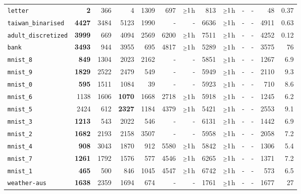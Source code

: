 \begin{tabular}{lrrrrrrrrrrrr}
\texttt{letter} & \textbf{2} & 366 & 4 & 1309 & 697 & $\mathsmaller{\geq}1$h & 813 & $\mathsmaller{\geq}1$h & - & - & 48 & 0.37\\
\texttt{taiwan\_binarised} & \textbf{4427} & 3484 & 5123 & 1990 & - & - & 6636 & $\mathsmaller{\geq}1$h & - & - & 4911 & 0.63\\
\texttt{adult\_discretized} & \textbf{3999} & 669 & 4094 & 2569 & 6200 & $\mathsmaller{\geq}1$h & 7511 & $\mathsmaller{\geq}1$h & - & - & 4252 & 0.12\\
\texttt{bank} & \textbf{3493} & 944 & 3955 & 695 & 4817 & $\mathsmaller{\geq}1$h & 5289 & $\mathsmaller{\geq}1$h & - & - & 3575 & 76\\
\texttt{mnist\_8} & \textbf{849} & 1304 & 2023 & 2162 & - & - & 5851 & $\mathsmaller{\geq}1$h & - & - & 1267 & 6.9\\
\texttt{mnist\_9} & \textbf{1829} & 2522 & 2479 & 549 & - & - & 5949 & $\mathsmaller{\geq}1$h & - & - & 2110 & 9.3\\
\texttt{mnist\_0} & \textbf{595} & 1511 & 1084 & 39 & - & - & 5923 & $\mathsmaller{\geq}1$h & - & - & 710 & 8.6\\
\texttt{mnist\_6} & 1138 & 1606 & \textbf{1070} & 1668 & 2718 & $\mathsmaller{\geq}1$h & 5918 & $\mathsmaller{\geq}1$h & - & - & 1245 & 6.2\\
\texttt{mnist\_5} & 2424 & 612 & \textbf{2327} & 1184 & 4379 & $\mathsmaller{\geq}1$h & 5421 & $\mathsmaller{\geq}1$h & - & - & 2553 & 9.1\\
\texttt{mnist\_3} & \textbf{1213} & 543 & 2022 & 546 & - & - & 6131 & $\mathsmaller{\geq}1$h & - & - & 1442 & 6.9\\
\texttt{mnist\_2} & \textbf{1682} & 2193 & 2158 & 3507 & - & - & 5958 & $\mathsmaller{\geq}1$h & - & - & 2058 & 7.2\\
\texttt{mnist\_4} & \textbf{908} & 3043 & 1870 & 912 & 5580 & $\mathsmaller{\geq}1$h & 5842 & $\mathsmaller{\geq}1$h & - & - & 1306 & 5.4\\
\texttt{mnist\_7} & \textbf{1261} & 1792 & 1576 & 577 & 4546 & $\mathsmaller{\geq}1$h & 6265 & $\mathsmaller{\geq}1$h & - & - & 1371 & 7.2\\
\texttt{mnist\_1} & \textbf{465} & 500 & 846 & 1045 & 4547 & $\mathsmaller{\geq}1$h & 6742 & $\mathsmaller{\geq}1$h & - & - & 573 & 6.5\\
\texttt{weather-aus} & \textbf{1638} & 2359 & 1694 & 674 & - & - & 1761 & $\mathsmaller{\geq}1$h & - & - & 1677 & 27\\
\bottomrule
\end{tabular}
